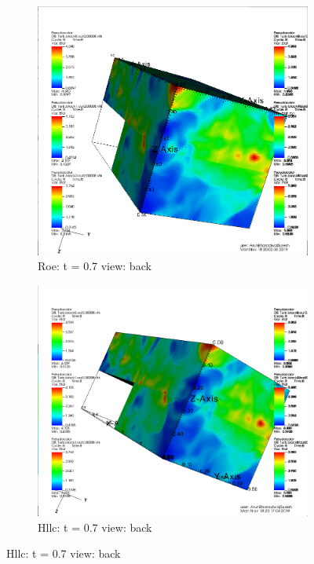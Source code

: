 \documentclass[12pt]{article}
\begin{document}
\begin{figure}[h]
	\centering
	\begin{subfigure}[h]{0.4500\textwidth}
		\centering
		\includegraphics[width=\textwidth]{roet8a.png}
		\caption{Roe: t = 0.7 view: back}
	\end{subfigure}
	\begin{subfigure}[h]{0.4500\textwidth}
		\centering
		\includegraphics[width=\textwidth]{hllct8a.png}
		\caption{Hllc: t = 0.7 view: back}
	\end{subfigure}
\end{figure}
\end{document}

